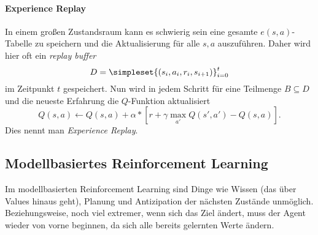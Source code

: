 \paragraph{Experience Replay}
In einem großen Zustandsraum kann es schwierig sein eine gesamte $e(s,a)$-Tabelle zu speichern und die Aktualisierung für alle $s,a$ auszuführen. Daher wird hier oft ein \emph{replay buffer}
\begin{equation*}
	D=\simpleset{(s_i,a_i,r_i,s_{i+1})}_{i=0}^t
\end{equation*}
im Zeitpunkt $t$ gespeichert. Nun wird in jedem Schritt für eine Teilmenge $B\subseteq D$ und die neueste Erfahrung die $Q$-Funktion aktualisiert
\begin{equation*}
	Q(s,a)\leftarrow Q(s,a)+\alpha*[r+\gamma\max_{a'}Q(s',a')-Q(s,a)].
\end{equation*}
Dies nennt man \emph{Experience Replay}.

\subsection{Modellbasiertes Reinforcement Learning}
Im modellbasierten Reinforcement Learning sind Dinge wie Wissen (das über Values hinaus geht), Planung und Antizipation der nächsten Zustände unmöglich.
Beziehungsweise, noch viel extremer, wenn sich das Ziel ändert, muss der Agent wieder von vorne beginnen, da sich alle bereits gelernten Werte ändern.

